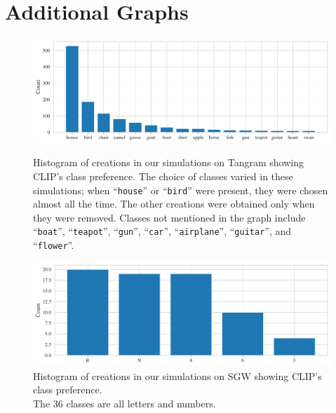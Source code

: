 \chapter{Additional Graphs}
\label{sec:additional-graphs}

\begin{figure}[h]
    \centering
    \includegraphics[width=\textwidth]{images/creations_distribution.pdf}
    \vspace{-12pt}
    \caption[Histogram of creations in our simulations on Tangram showing CLIP's class preference.]{Histogram of creations in our simulations on Tangram showing CLIP's class preference. The choice of classes varied in these simulations; when ``\texttt{house}'' or ``\texttt{bird}'' were present, they were chosen almost all the time. The other creations were obtained only when they were removed. Classes not mentioned in the graph include ``\texttt{boat}'', ``\texttt{teapot}'', ``\texttt{gun}'', ``\texttt{car}'', ``\texttt{airplane}'', ``\texttt{guitar}'', and ``\texttt{flower}''.}
    \label{fig:class-preference-tangram}
    \vspace{12pt}
    \includegraphics[width=\textwidth]{images/creations_distribution_sgw.pdf}
    \vspace{-12pt}
    \captionsetup{justification=centering}
    \caption[Histogram of creations in our simulations on SGW showing CLIP's class preference.]{Histogram of creations in our simulations on SGW showing CLIP's class preference.\\The \(36\) classes are all letters and numbers.}
    \label{fig:class-preference-sgw}
\end{figure}

